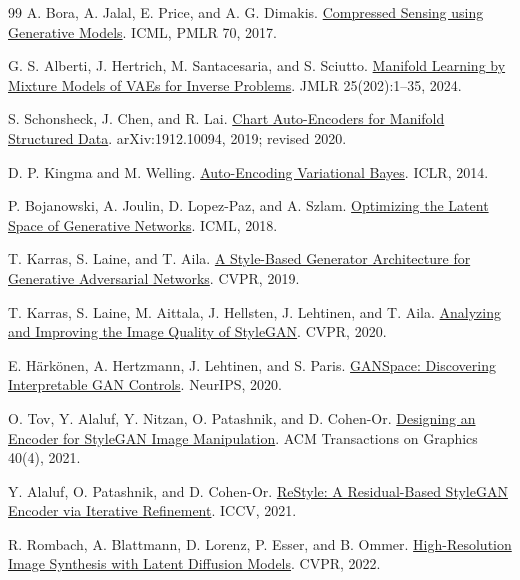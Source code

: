 \documentclass[11pt,a4paper]{article}
\theoremstyle{definition}
\theoremstyle{definition}
\theoremstyle{remark}\newtheorem{remark}[theorem]{Remark}
\begin{document}
\renewcommand{\refname}{Primary-source references}
\begin{thebibliography}{99}
\small
{}
A. Bora, A. Jalal, E. Price, and A. G. Dimakis.
\href{https://proceedings.mlr.press/v70/bora17a.html}{Compressed Sensing using Generative Models}.
ICML, PMLR 70, 2017.

G. S. Alberti, J. Hertrich, M. Santacesaria, and S. Sciutto.
\href{https://jmlr.org/papers/v25/23-0396.html}{Manifold Learning by Mixture Models of VAEs for Inverse Problems}.
JMLR 25(202):1--35, 2024.

S. Schonsheck, J. Chen, and R. Lai.
\href{https://arxiv.org/abs/1912.10094}{Chart Auto-Encoders for Manifold Structured Data}.
arXiv:1912.10094, 2019; revised 2020.

D. P. Kingma and M. Welling.
\href{https://arxiv.org/abs/1312.6114}{Auto-Encoding Variational Bayes}.
ICLR, 2014.

P. Bojanowski, A. Joulin, D. Lopez-Paz, and A. Szlam.
\href{https://arxiv.org/abs/1707.05776}{Optimizing the Latent Space of Generative Networks}.
ICML, 2018.

T. Karras, S. Laine, and T. Aila.
\href{https://arxiv.org/abs/1812.04948}{A Style-Based Generator Architecture for Generative Adversarial Networks}.
CVPR, 2019.

T. Karras, S. Laine, M. Aittala, J. Hellsten, J. Lehtinen, and T. Aila.
\href{https://arxiv.org/abs/1912.04958}{Analyzing and Improving the Image Quality of StyleGAN}.
CVPR, 2020.

E. H\"ark\"onen, A. Hertzmann, J. Lehtinen, and S. Paris.
\href{https://arxiv.org/abs/2004.02546}{GANSpace: Discovering Interpretable GAN Controls}.
NeurIPS, 2020.

O. Tov, Y. Alaluf, Y. Nitzan, O. Patashnik, and D. Cohen-Or.
\href{https://arxiv.org/abs/2102.02766}{Designing an Encoder for StyleGAN Image Manipulation}.
ACM Transactions on Graphics 40(4), 2021.

Y. Alaluf, O. Patashnik, and D. Cohen-Or.
\href{https://arxiv.org/abs/2104.02699}{ReStyle: A Residual-Based StyleGAN Encoder via Iterative Refinement}.
ICCV, 2021.

R. Rombach, A. Blattmann, D. Lorenz, P. Esser, and B. Ommer.
\href{https://arxiv.org/abs/2112.10752}{High-Resolution Image Synthesis with Latent Diffusion Models}.
CVPR, 2022.


\end{thebibliography}
\end{document}

